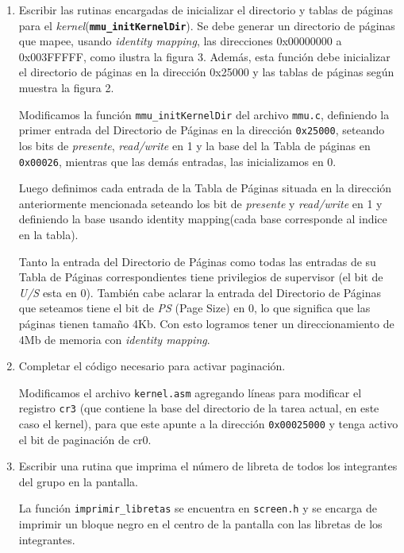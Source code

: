 \documentclass[a4paper]{article}
\begin{document}
 \begin{enumerate}[label=\alph*)]
 	
 	\item Escribir las rutinas encargadas de inicializar el directorio y tablas de páginas para el	\textit{kernel}(\texttt{\textbf{mmu_initKernelDir}}). Se debe generar un directorio de páginas que mapee, usando \textit{identity mapping}, las direcciones 0x00000000 a 0x003FFFFF, como ilustra la figura 3. Además, esta función debe inicializar el directorio de páginas en la dirección 0x25000 y las tablas de páginas según muestra la figura 2.
 	
 	
 	Modificamos la función \texttt{mmu\_initKernelDir} del archivo \texttt{mmu.c}, definiendo la primer entrada del Directorio de P\'aginas en la direcci\'on \texttt{0x25000}, seteando los bits de \textit{presente}, \textit{read/write} en 1 y la base del la Tabla de p\'aginas en \texttt{0x00026}, mientras que las demás entradas, las inicializamos en 0.
 	
 	Luego definimos cada entrada de la Tabla de P\'aginas situada en la direcci\'on anteriormente mencionada seteando los bit de \textit{presente} y \textit{read/write} en 1 y definiendo la base usando identity mapping(cada base corresponde al indice en la tabla). 
 	
 	Tanto la entrada del Directorio de P\'aginas como todas las entradas de su Tabla de P\'aginas correspondientes tiene privilegios de supervisor (el bit de \textit{U/S} esta en 0). Tambi\'en cabe aclarar la entrada del Directorio de P\'aginas que seteamos tiene el bit de \textit{PS} (Page Size) en 0, lo que significa que las p\'aginas tienen tama\~no 4Kb. Con esto logramos tener un direccionamiento de 4Mb de memoria con \textit{identity mapping}.
 	
 	\item Completar el código necesario para activar paginación.
 	
 	Modificamos el archivo \texttt{kernel.asm} agregando l\'ineas para modificar el registro \texttt{cr3} (que contiene la base del directorio de la tarea actual, en este caso el kernel), para que este apunte a la dirección \texttt{0x00025000} y tenga activo el bit de paginación de cr0.
 	
 	\item Escribir una rutina que imprima el número de libreta de todos los integrantes del grupo en la pantalla.
 	
 	La funci\'on \texttt{imprimir\_libretas} se encuentra en \texttt{screen.h} y se encarga de imprimir un bloque negro en el centro de la pantalla con las libretas de los integrantes.
 \end{enumerate}
 
\end{document}
